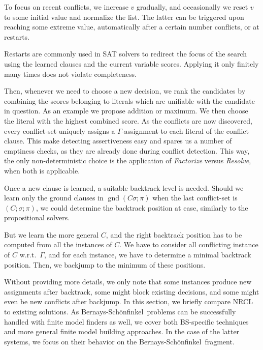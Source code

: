 \documentclass[a4paper]{article}
\newcommand{\mGnd}{\operatorname{gnd}} \newcommand{\mLVar}{\operatorname{lvar}} \newcommand{\mRVar}{\operatorname{rvar}} \newcommand{\mDmn}{\operatorname{dom}} \newcommand{\mRng}{\operatorname{rng}} \newcommand{\mMGU}{\operatorname{mgu}} \newcommand{\mDef}{\operatorname{def}} \newcommand{\mDomain}{\mathcal{D}} \newcommand{\mVar}{\operatorname{var}}
\newcommand{\mEPR}{Bernays-Sch\"onfinkel}
\newcommand{\mEPRs}{BS}
\begin{document}
To focus on recent conflicts, we increase $v$ gradually, and occasionally we reset $v$ to some initial value and normalize the list.
The latter can be triggered upon reaching some extreme value, automatically after a certain number conflicts, or 
at restarts. 

Restarts are commonly used in SAT solvers to redirect the focus of the search using the learned clauses and the current variable scores. 
Applying it only finitely many times does not violate completeness.

Then, whenever we need to choose a new decision, we rank the candidates by combining the scores belonging to literals which are unifiable with
the candidate in question. As an example we propose addition or maximum. We then choose the literal with the highest combined score.
As the conflicts are now discovered, every conflict-set uniquely assigns a $\Gamma$-assignment to each literal of 
the conflict clause. This make detecting assertiveness easy and spares us a number of emptiness checks, as they 
are already done during conflict detection. 
This way, the only non-deterministic choice is the application of \emph{Factorize} versus \emph{Resolve}, when both is applicable. 

Once a new clause is learned, a suitable backtrack level is needed. 
Should we learn only the ground clauses in $\mGnd(C\sigma; \pi)$ when the last conflict-set  is $(C; \sigma; \pi)$, 
we could determine the backtrack position at ease, similarly to the propositional solvers. 

But we learn the more general $C$, and the right backtrack position has to be computed from all the 
instances of $C$.
We have to consider all conflicting instance of $C$ w.r.t.\ $\Gamma$, and for each instance, we have to determine a minimal backtrack position.
Then, we backjump to the minimum of these positions. 

Without providing more details, we only note that some instances produce new assignments after backtrack, some might block existing decisions, and some might even
be new conflicts after backjump. %
In this section, we briefly compare NRCL to existing solutions.
As \mEPR~problems can be successfully handled with finite model finders as well, 
we cover both \mEPRs-specific techniques and more general finite model building approaches.
In the case of the latter systems, we focus on their behavior on the \mEPR~fragment.
\end{document}
